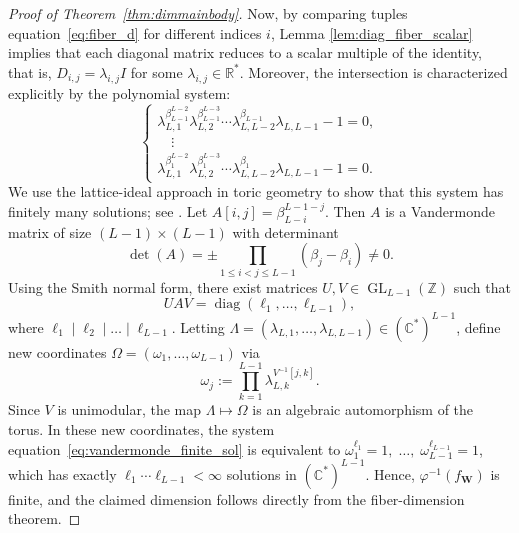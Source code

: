 \documentclass{article} %
\def\eqref#1{equation~\ref{#1}}
\theoremstyle{plain}%
\theoremstyle{definition}
\theoremstyle{remark}
\begin{document}
\begin{proof}[Proof of Theorem~\ref{thm:dimmainbody}]
Now, by comparing tuples \eqref{eq:fiber_d} for different indices $i$, Lemma \ref{lem:diag_fiber_scalar} implies that each diagonal matrix reduces to a scalar multiple of the identity, that is, $D_{i,j} = \lambda_{i,j} I$ for some $\lambda_{i,j} \in \mathbb{R}^*$.
Moreover, the intersection is characterized explicitly by the polynomial system:
\begin{equation}
\label{eq:vandermonde_finite_sol}
\begin{cases}
\lambda_{L,1}^{\beta_{L-1}^{L-2}} \lambda_{L,2}^{\beta_{L-1}^{L-3}} \cdots \lambda_{L,L-2}^{\beta_{L-1}} \lambda_{L,L-1}-1 = 0, \\
\quad\vdots \\
\lambda_{L,1}^{\beta_1^{L-2}} \lambda_{L,2}^{\beta_1^{L-3}} \cdots \lambda_{L,L-2}^{\beta_1} \lambda_{L,L-1}-1 = 0.
\end{cases}
\end{equation}
We use the lattice-ideal approach in toric geometry to show that this system has finitely many solutions; see \citep[Section~7]{csahin2023rational}. Let $A[i,j] = \beta_{L-i}^{L-1-j}$. Then $A$ is a Vandermonde matrix of size $(L-1)\times(L-1)$ with determinant
\begin{equation}
\det(A)=\pm \prod_{1\le i<j\le L-1}(\beta_j-\beta_i) \neq 0.
\end{equation}
Using the Smith normal form, there exist matrices $U,V\in\operatorname{GL}_{L-1}(\mathbb{Z})$ such that
\begin{equation} 
  UAV = \operatorname{diag}(\ell_1,\dots,\ell_{L-1}),
\end{equation}
where $\ell_1\mid\ell_2\mid\dots\mid\ell_{L-1}$. 
Letting $\Lambda=(\lambda_{L,1},\dots,\lambda_{L,L-1})\in(\mathbb C^*)^{L-1}$, define new coordinates $\Omega=(\omega_1,\dots,\omega_{L-1})$ via
\begin{equation}
\omega_j := \prod_{k=1}^{L-1}\lambda_{L,k}^{V^{-1}[j,k]}. 
\end{equation}
Since $V$ is unimodular, the map $\Lambda\mapsto\Omega$ is an algebraic automorphism of the torus. In these new coordinates, the system \eqref{eq:vandermonde_finite_sol} is equivalent to $\omega_1^{\ell_1}=1,\;\dots,\; \omega_{L-1}^{\ell_{L-1}}=1$,
which has exactly $\ell_1 \cdots \ell_{L-1}<\infty$ solutions in $(\mathbb{C}^*)^{L-1}$. Hence, $\varphi^{-1}(f_{\mathbf{W}})$ is finite, and the claimed dimension follows directly from the fiber-dimension theorem.
\end{proof}
\end{document}
